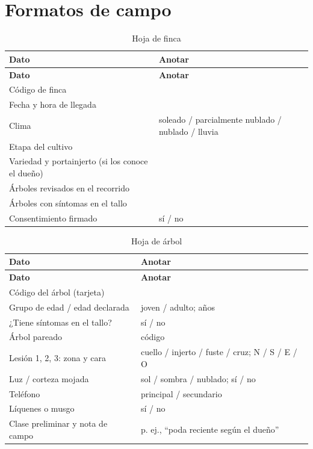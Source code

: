 \documentclass[11pt]{article}
\begin{document}
\section{Formatos de campo}
{\small
\begin{longtable}{|>{\RaggedRight\arraybackslash}p{6.06cm}|>{\RaggedRight\arraybackslash}p{8.8cm}|}
\caption{Hoja de finca}\\
\hline
\rowcolor{encabezado}\textbf{Dato} & \textbf{Anotar} \\ \hline
\endfirsthead
\hline
\rowcolor{encabezado}\textbf{Dato} & \textbf{Anotar} \\ \hline
\endhead
Código de finca &  \\ \hline
Fecha y hora de llegada &  \\ \hline
Clima & soleado / parcialmente nublado / nublado / lluvia \\ \hline
Etapa del cultivo &  \\ \hline
Variedad y portainjerto (si los conoce el dueño) &  \\ \hline
Árboles revisados en el recorrido &  \\ \hline
Árboles con síntomas en el tallo &  \\ \hline
Consentimiento firmado & sí / no \\ \hline
\end{longtable}}
{\small
\begin{longtable}{|>{\RaggedRight\arraybackslash}p{6.06cm}|>{\RaggedRight\arraybackslash}p{8.8cm}|}
\caption{Hoja de árbol}\\
\hline
\rowcolor{encabezado}\textbf{Dato} & \textbf{Anotar} \\ \hline
\endfirsthead
\hline
\rowcolor{encabezado}\textbf{Dato} & \textbf{Anotar} \\ \hline
\endhead
Código del árbol (tarjeta) &  \\ \hline
Grupo de edad / edad declarada & joven / adulto; años \\ \hline
¿Tiene síntomas en el tallo? & sí / no \\ \hline
Árbol pareado & código \\ \hline
Lesión 1, 2, 3: zona y cara & cuello / injerto / fuste / cruz; N / S / E / O \\ \hline
Luz / corteza mojada & sol / sombra / nublado; sí / no \\ \hline
Teléfono & principal / secundario \\ \hline
Líquenes o musgo & sí / no \\ \hline
Clase preliminar y nota de campo & p. ej., “poda reciente según el dueño” \\ \hline
\end{longtable}}
\end{document}
